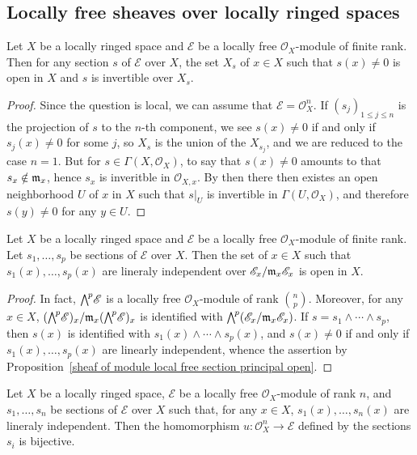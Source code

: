 \subsection{Locally free sheaves over locally ringed spaces}
\begin{proposition}\label{sheaf of module local free section principal open}
Let $X$ be a locally ringed space and $\mathscr{E}$ be a locally free $\mathscr{O}_X$-module of finite rank. Then for any section $s$ of $\mathscr{E}$ over $X$, the set $X_s$ of $x\in X$ such that $s(x)\neq 0$ is open in $X$ and $s$ is invertible over $X_s$.
\end{proposition}
\begin{proof}
Since the question is local, we can assume that $\mathscr{E}=\mathscr{O}_X^n$. If $(s_j)_{1\leq j\leq n}$ is the projection of $s$ to the $n$-th component, we see $s(x)\neq 0$ if and only if $s_j(x)\neq 0$ for some $j$, so $X_s$ is the union of the $X_{s_j}$, and we are reduced to the case $n=1$. But for $s\in\Gamma(X,\mathscr{O}_X)$, to say that $s(x)\neq 0$ amounts to that $s_x\notin\mathfrak{m}_x$, hence $s_x$ is inveritble in $\mathscr{O}_{X,x}$. By then there then existes an open neighborhood $U$ of $x$ in $X$ such that $s|_U$ is invertible in $\Gamma(U,\mathscr{O}_X)$, and therefore $s(y)\neq 0$ for any $y\in U$.
\end{proof}
\begin{corollary}\label{sheaf of module local free section li open}
Let $X$ be a locally ringed space and $\mathscr{E}$ be a locally free $\mathscr{O}_X$-module of finite rank. Let $s_1,\dots,s_p$ be sections of $\mathscr{E}$ over $X$. Then the set of $x\in X$ such that $s_1(x),\dots,s_p(x)$ are lineraly independent over $\mathscr{E}_x/\mathfrak{m}_x\mathscr{E}_x$ is open in $X$.
\end{corollary}
\begin{proof}
In fact, $\bigw^p\mathscr{E}$ is a locally free $\mathscr{O}_X$-module of rank $\binom{n}{p}$. Moreover, for any $x\in X$, $(\bigw^p\mathscr{E})_x/\m_x(\bigw^p\mathscr{E})_x$ is identified with $\bigw^p(\mathscr{E}_x/\m_x\mathscr{E}_x)$. If $s=s_1\wedge\cdots\wedge s_p$, then $s(x)$ is identified with $s_1(x)\wedge\cdots\wedge s_p(x)$, and $s(x)\neq 0$ if and only if $s_1(x),\dots,s_p(x)$ are linearly independent, whence the assertion by Proposition~\ref{sheaf of module local free section principal open}. 
\end{proof}
\begin{corollary}\label{sheaf of module local free section define iso if li}
Let $X$ be a locally ringed space, $\mathscr{E}$ be a locally free $\mathscr{O}_X$-module of rank $n$, and $s_1,\dots,s_n$ be sections of $\mathscr{E}$ over $X$ such that, for any $x\in X$, $s_1(x),\dots,s_n(x)$ are lineraly independent. Then the homomorphism $u:\mathscr{O}_X^n\to\mathscr{E}$ defined by the sections $s_i$ is bijective.
\end{corollary}
